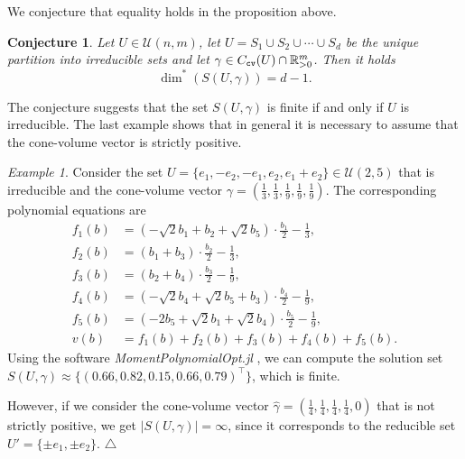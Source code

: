 \documentclass[11pt, a4paper, twoside, reqno]{amsart}
\newcommand{\R}{\mathbb{R}}
\newtheorem{conjecture}[theorem]{Conjecture}
\theoremstyle{definition}
\theoremstyle{remark}
\newtheorem{example}[theorem]{Example}
\newcommand{\cv}{{\tt cv}}
\numberwithin{equation}{section}
\begin{document}
We conjecture that equality holds in the proposition above.
\begin{conjecture}
  \label{Conjecture:NumberOfSol}
  Let \( U \in \mathcal{U}(n,m) \), 
let $U=S_1\cup S_2 \cup
\cdots \cup S_d$ be the unique partition into irreducible sets and let $\gamma \in C_{\cv}(U) \cap \R_{>0}^m$. 
Then it holds
\begin{equation*}
    \dim^*(S(U, \gamma)) = d - 1.
\end{equation*}
  \end{conjecture}
The conjecture suggests that the set \( S(U, \gamma) \) is finite if and only if \( U \) is irreducible. 
The last example shows that in general it is necessary to assume that the cone-volume vector is strictly positive. 

\begin{example}
    Consider the set $U = \{ e_1, -e_2,-e_1,e_2,e_1+e_2 \} \in \mathcal{U}(2,5)$ that is irreducible and the cone-volume vector $\gamma = \left(\frac{1}{3},\frac{1}{3},\frac{1}{9},\frac{1}{9},\frac{1}{9}\right)$. 
    The corresponding polynomial equations are
    \begin{align*}
        f_1(b) & = \left( - \sqrt{2} b_1 + b_2 + \sqrt{2} b_5 \right) \cdot \frac{b_1}{2} - \frac{1}{3}, \\
        f_2(b) & = \left( b_1 + b_3 \right) \cdot \frac{b_2}{2} - \frac{1}{3}, \\
        f_3(b) & = \left( b_2 + b_4 \right) \cdot \frac{b_3}{2} - \frac{1}{9}, \\
        f_4(b) & = \left( -\sqrt{2} b_4 + \sqrt{2} b_5 + b_3 \right) \cdot \frac{b_4}{2} - \frac{1}{9}, \\
        f_5(b) & = \left( - 2 b_5 + \sqrt{2} b_1 + \sqrt{2} b_4 \right) \cdot \frac{b_5}{2} - \frac{1}{9}, \\
        v(b) & = f_1(b) + f_2(b) + f_3(b) + f_4(b) + f_5(b).
    \end{align*}
    Using the software \emph{MomentPolynomialOpt.jl} \cite{MomentPolynomialOpt}, we can compute the solution set $S(U,\gamma) \approx \{ (0.66,0.82,0.15,0.66,0.79)^\intercal \}$, which is finite. 
    
    However, if we consider the cone-volume vector $\hat{\gamma} = (\frac{1}{4},\frac{1}{4},\frac{1}{4},\frac{1}{4},0)$ that is not strictly positive, we get $|S(U,\gamma)| = \infty$, since it corresponds to the reducible set $U' = \{ \pm e_1,\pm e_2 \}$. \hfill$\triangle$
\end{example}
\end{document}
